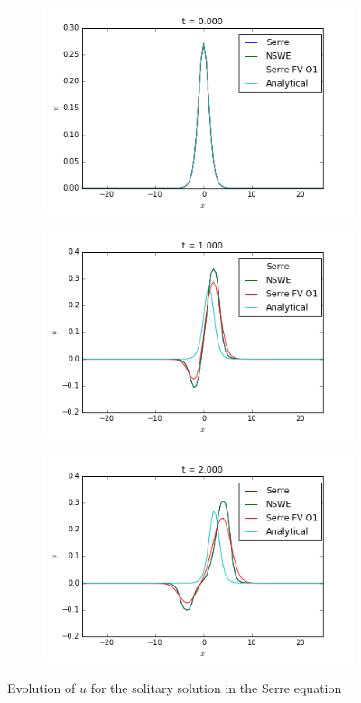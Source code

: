 \begin{figure}[h!]
	\begin{subfigure}{.3\linewidth}
		\includegraphics[scale=.3]{figures/Serre/solitary1u.png}	
	\end{subfigure}
	\begin{subfigure}{.3\linewidth}
		\includegraphics[scale=.3]{figures/Serre/solitary2u.png}	
	\end{subfigure}
	\begin{subfigure}{.3\linewidth}
		\includegraphics[scale=.3]{figures/Serre/solitary3u.png}	
	\end{subfigure}
	\caption{Evolution of $u$ for the solitary solution in the Serre equation \label{fig:solitaryu}}
\end{figure}

